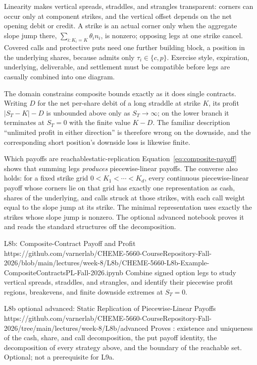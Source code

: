 \documentclass[11pt]{article}
\begin{document}
Linearity makes vertical spreads, straddles, and strangles transparent: corners can occur only at component strikes, and the vertical offset depends on the net opening debit or credit. A strike is an actual corner only when the aggregate slope jump there, $\sum_{i:K_i=K}\theta_in_i$, is nonzero; opposing legs at one strike cancel. Covered calls and protective puts need one further building block, a position in the underlying shares, because  admits only $\tau_i\in\{c,p\}$. Exercise style, expiration, underlying, deliverable, and settlement must be compatible before legs are casually combined into one diagram.

The domain constrains composite bounds exactly as it does single contracts. Writing $D$ for the net per-share debit of a long straddle at strike $K$, its profit $\lvert S_T-K\rvert-D$ is unbounded above only as $S_T\to\infty$; on the lower branch it terminates at $S_T=0$ with the finite value $K-D$. The familiar description ``unlimited profit in either direction'' is therefore wrong on the downside, and the corresponding short position's downside loss is likewise finite.

\begin{remark}{Which payoffs are reachable}{static-replication}
Equation~\eqref{eq:composite-payoff} shows that summing legs \emph{produces} piecewise-linear payoffs. The converse also holds: for a fixed strike grid $0<K_1<\cdots<K_d$, every continuous piecewise-linear payoff whose corners lie on that grid has exactly one representation as cash, shares of the underlying, and calls struck at those strikes, with each call weight equal to the slope jump at its strike. The minimal representation uses exactly the strikes whose slope jump is nonzero. The optional advanced notebook proves it and reads the standard structures off the decomposition.
\end{remark}

\notebooklink
  {L8b: Composite-Contract Payoff and Profit}
  {https://github.com/varnerlab/CHEME-5660-CourseRepository-Fall-2026/blob/main/lectures/week-8/L8b/CHEME-5660-L8b-Example-CompositeContractsPL-Fall-2026.ipynb}
  {Combine signed option legs to study vertical spreads, straddles, and strangles, and identify their piecewise profit regions, breakevens, and finite downside extremes at $S_T=0$.}

\notebooklink
  {L8b optional advanced: Static Replication of Piecewise-Linear Payoffs}
  {https://github.com/varnerlab/CHEME-5660-CourseRepository-Fall-2026/tree/main/lectures/week-8/L8b/advanced}
  {Proves : existence and uniqueness of the cash, share, and call decomposition, the put payoff identity, the decomposition of every strategy above, and the boundary of the reachable set. Optional; not a prerequisite for L9a.}
\end{document}
